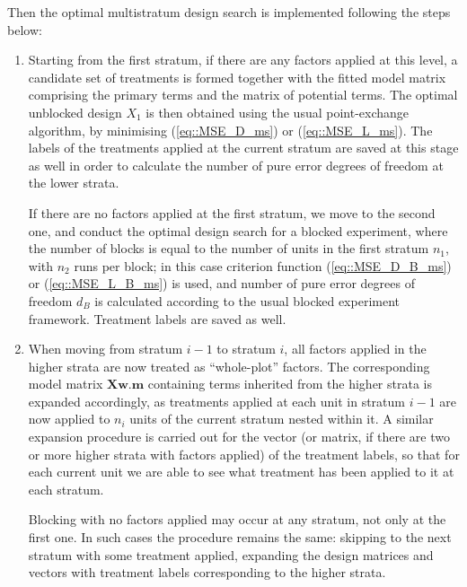 Then the optimal multistratum design search is implemented following the steps below:
\begin{enumerate}
\item Starting from the first stratum, if there are any factors applied at this level, a candidate set of treatments is formed together with the fitted model matrix comprising the primary terms and the matrix of potential terms. The optimal unblocked design $X_1$ is then obtained using the usual point-exchange algorithm, by minimising (\ref{eq::MSE_D_ms}) or (\ref{eq::MSE_L_ms}). The labels of the treatments applied at the current stratum are saved at this stage as well in order to calculate the number of pure error degrees of freedom at the lower strata.

If there are no factors applied at the first stratum, we move to the second one, and conduct the optimal design search for a blocked experiment, where the number of blocks is equal to the number of units in the first stratum $n_1$, with $n_2$ runs per block; in this case criterion function (\ref{eq::MSE_D_B_ms}) or (\ref{eq::MSE_L_B_ms}) is used, and number of pure error degrees of freedom $d_B$ is calculated according to the usual blocked experiment framework. Treatment labels are saved as well. 
 
\item When moving from stratum $i-1$ to stratum $i$, all factors applied in the higher strata are now treated as ``whole-plot'' factors. The corresponding model matrix $\bm{Xw.m}$ containing terms inherited from the higher strata is expanded accordingly, as treatments applied at each unit in stratum $i-1$ are now applied to $n_i$ units of the current stratum nested within it. A similar expansion procedure is carried out for the vector (or matrix, if there are two or more higher strata with factors applied) of the treatment labels, so that for each current unit we are able to see what treatment has been applied to it at each stratum.

Blocking with no factors applied may occur at any stratum, not only at the first one. In such cases the procedure remains the same: skipping to the next stratum with some treatment applied, expanding the design matrices and vectors with treatment labels corresponding to the higher strata.


\end{enumerate}
